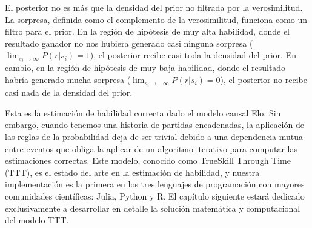 \documentclass[a4paper,10pt]{book}
\theoremstyle{definition}
\newif\ifen
\newif\ifes
\newcommand{\en}[1]{\ifen#1\fi}
\newcommand{\es}[1]{\ifes#1\fi}
\begin{document}
%
\begin{figure}[ht!]
    \centering
    \en{\texttt{[image: figures/posterior\_win]}}
    \es{\texttt{[image: figures/posterior\_win]}}
    \caption{
    \en{Belief update for the winning case. }%
    \es{Actualizaci\'on de creencias para el caso ganador. }%
    \en{The proportional posterior is obtained as the product of the prior (Gaussian) and the likelihood (cumulative Gaussian). }%
    \es{El posterior proporcional se obtiene como el producto de la distribuci\'on a priori (distribuci\'on gaussiana) y la verosimilitud (distribuci\'on gaussiana acumulada). }%
    \en{The evidence is the integral of the proportional posterior. }%
    \es{La evidencia es la integral del posterior proporcional. }%
    \en{The distributions are not necessarily on the same scale: the prior integrates to $1$, while the likelihood goes from $0$ to $1$. }%
    \es{Las distribuciones no est\'an necesariamente en la misma escala: la distribuci\'on a priori integra 1, mientras que la verosimilitud va de 0 a 1. }%
    }
    \label{fig:posterior_win}
\end{figure}

El posterior no es m\'as que la densidad del prior no filtrada por la verosimilitud.
%
La sorpresa, definida como el complemento de la verosimilitud, funciona como un filtro para el prior.
%    
En la regi\'on de hip\'otesis de muy alta habilidad, donde el resultado ganador no nos hubiera generado casi ninguna sorpresa ($\lim_{s_i \to \infty}P(r|s_i) = 1$), el posterior recibe casi toda la densidad del prior.
%
En cambio, en la regi\'on de hip\'otesis de muy baja habilidad, donde el resultado habr\'ia generado mucha sorpresa ($\lim_{s_i \to -\infty}P(r|s_i) = 0$), el posterior no recibe casi nada de la densidad del prior.


Esta es la estimaci\'on de habilidad correcta dado el modelo causal Elo.
%
Sin embargo, cuando tenemos una historia de partidas encadenadas, la aplicaci\'on de las reglas de la probabilidad deja de ser trivial debido a una dependencia mutua entre eventos que obliga la aplicar de un algoritmo iterativo para computar las estimaciones correctas.
%
Este modelo, conocido como TrueSkill Through Time (TTT), es el estado del arte en la estimaci\'on de habilidad, y nuestra implementaci\'on es la primera en los tres lenguajes de programaci\'on con mayores comunidades cient\'ificas: Julia, Python y R.
%
El cap\'itulo siguiente estará dedicado exclusivamente a desarrollar en detalle la soluci\'on matemática y computacional del modelo TTT.
\end{document}
